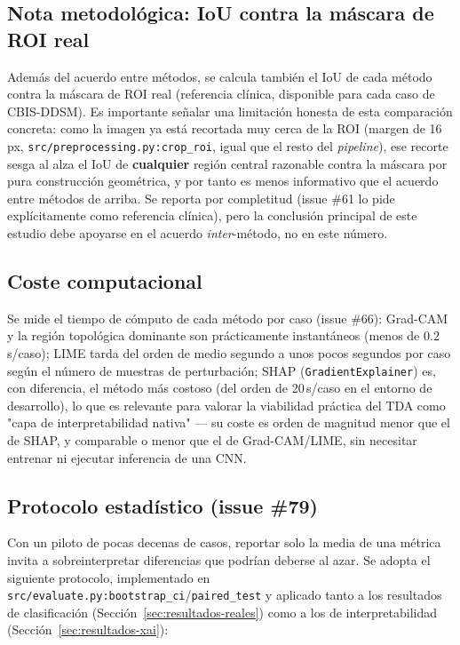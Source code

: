 \subsection{Nota metodológica: IoU contra la máscara de ROI real}
\label{subsec:iou-roi-limitacion}
Además del acuerdo entre métodos, se calcula también el IoU de cada método
contra la máscara de ROI real (referencia clínica, disponible para cada caso
de CBIS-DDSM). Es importante señalar una limitación honesta de esta
comparación concreta: como la imagen ya está recortada muy cerca de la ROI
(margen de 16\,px, \texttt{src/preprocessing.py:crop\_roi}, igual que el
resto del \textit{pipeline}), ese recorte sesga al alza el IoU de
\textbf{cualquier} región central razonable contra la máscara por pura
construcción geométrica, y por tanto es menos informativo que el acuerdo
entre métodos de arriba. Se reporta por completitud (issue \#61 lo pide
explícitamente como referencia clínica), pero la conclusión principal de
este estudio debe apoyarse en el acuerdo \textit{inter}-método, no en este
número.

\subsection{Coste computacional}
Se mide el tiempo de cómputo de cada método por caso (issue \#66): Grad-CAM
y la región topológica dominante son prácticamente instantáneos (menos de
$0.2$\,s/caso); LIME tarda del orden de medio segundo a unos pocos segundos
por caso según el número de muestras de perturbación; SHAP
(\texttt{GradientExplainer}) es, con diferencia, el método más costoso
(del orden de 20\,s/caso en el entorno de desarrollo), lo que es relevante
para valorar la viabilidad práctica del TDA como "capa de interpretabilidad
nativa" --- su coste es orden de magnitud menor que el de SHAP, y comparable
o menor que el de Grad-CAM/LIME, sin necesitar entrenar ni ejecutar
inferencia de una CNN.

\subsection{Protocolo estadístico (issue \#79)}
\label{subsec:protocolo-estadistico}
Con un piloto de pocas decenas de casos, reportar solo la media de una
métrica invita a sobreinterpretar diferencias que podrían deberse al azar.
Se adopta el siguiente protocolo, implementado en
\texttt{src/evaluate.py:bootstrap\_ci}/\texttt{paired\_test} y aplicado
tanto a los resultados de clasificación (Sección~\ref{sec:resultados-reales})
como a los de interpretabilidad (Sección~\ref{sec:resultados-xai}):

